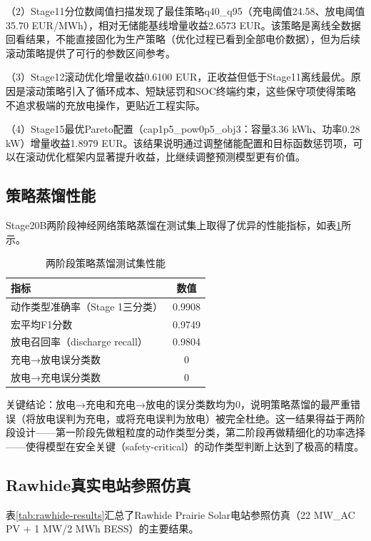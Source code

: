 \documentclass[12pt,a4paper]{ctexbook}
\begin{document}
（2）Stage11分位数阈值扫描发现了最佳策略q40\_q95（充电阈值24.58、放电阈值35.70 EUR/MWh），相对无储能基线增量收益2.6573 EUR。该策略是离线全数据回看结果，不能直接固化为生产策略（优化过程已看到全部电价数据），但为后续滚动策略提供了可行的参数区间参考。

（3）Stage12滚动优化增量收益0.6100 EUR，正收益但低于Stage11离线最优。原因是滚动策略引入了循环成本、短缺惩罚和SOC终端约束，这些保守项使得策略不追求极端的充放电操作，更贴近工程实际。

（4）Stage15最优Pareto配置（cap1p5\_pow0p5\_obj3：容量3.36 kWh、功率0.28 kW）增量收益1.8979 EUR。该结果说明通过调整储能配置和目标函数惩罚项，可以在滚动优化框架内显著提升收益，比继续调整预测模型更有价值。

\subsection{策略蒸馏性能}

Stage20B两阶段神经网络策略蒸馏在测试集上取得了优异的性能指标，如表\ref{tab:distillation-results}所示。

\begin{table}[H]
\centering
\caption{两阶段策略蒸馏测试集性能}
\label{tab:distillation-results}
\begin{tabular}{@{}lc@{}}
\toprule
\textbf{指标} & \textbf{数值} \\
\midrule
动作类型准确率（Stage 1三分类） & 0.9908 \\
宏平均F1分数 & 0.9749 \\
放电召回率（discharge recall） & 0.9804 \\
充电→放电误分类数 & 0 \\
放电→充电误分类数 & 0 \\
\bottomrule
\end{tabular}
\end{table}

关键结论：放电→充电和充电→放电的误分类数均为0，说明策略蒸馏的最严重错误（将放电误判为充电，或将充电误判为放电）被完全杜绝。这一结果得益于两阶段设计——第一阶段先做粗粒度的动作类型分类，第二阶段再做精细化的功率选择——使得模型在安全关键（safety-critical）的动作类型判断上达到了极高的精度。

\subsection{Rawhide真实电站参照仿真}

表\ref{tab:rawhide-results}汇总了Rawhide Prairie Solar电站参照仿真（22 MW\_AC PV + 1 MW/2 MWh BESS）的主要结果。
\end{document}

